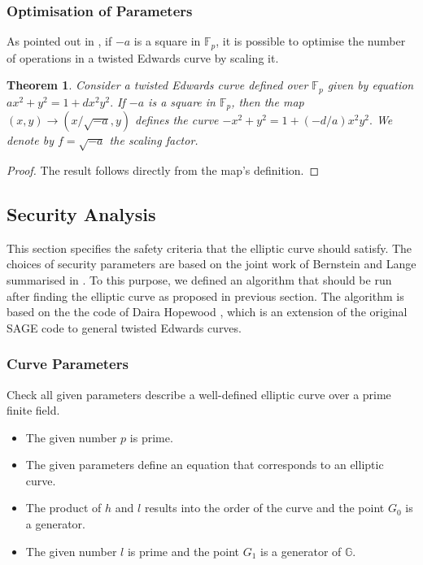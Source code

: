 \documentclass{article}
\newcommand{\Fp}{\ensuremath{\mathbb{F}_p}}
\newcommand{\G}{\ensuremath{\mathbb{G}}}
\newtheorem{thm}{Theorem}[section]
\theoremstyle{definition}
\theoremstyle{remark}
\begin{document}
	\subsubsection{Optimisation of Parameters}
	
	As pointed out in \cite[Sec. 3.1]{scaling}, if $-a$ is a square in $\Fp$, it is possible to optimise the number of operations in a twisted Edwards curve by scaling it. 
	
	\begin{thm} \label{thm-scale} %
		Consider a twisted Edwards curve defined over $\Fp$ given by equation $ax^2+y^2= 1 +dx^2y^2.$ If $-a$ is a square in $\Fp$, then the map $(x, y) \to (x/\sqrt{-a}, y)$ defines the curve $-x^2+y^2= 1 +(-d/a)x^2y^2.$ We denote by $f = \sqrt{-a}$ the scaling factor.
	\end{thm}
	
	\begin{proof}
		The result follows directly from the map's definition.
	\end{proof}
	
	\subsection{Security Analysis}
	
	This section specifies the safety criteria that the elliptic curve should satisfy. The choices of security parameters are based on the joint work of Bernstein and Lange summarised in \cite{safe-curves}. To this purpose, we defined an algorithm that should be run after finding the elliptic curve as proposed in previous section. The algorithm is based on the the code of Daira Hopewood \cite{github:daira:safe}, which is an extension of the original SAGE code \cite{safe-curves} to general twisted Edwards curves.
	
	\subsubsection{Curve Parameters}
	
	Check all given parameters describe a well-defined elliptic curve over a prime finite field.
	
	\begin{itemize}
		\item The given number $p$ is prime.
		\item The given parameters define an equation that corresponds to an elliptic curve.
		\item The product of $h$ and $l$ results into the order of the curve and the point $G_0$ is a generator.
		\item The given number $l$ is prime and the point $G_1$ is a generator of $\G$.
	\end{itemize}
	
\end{document}
